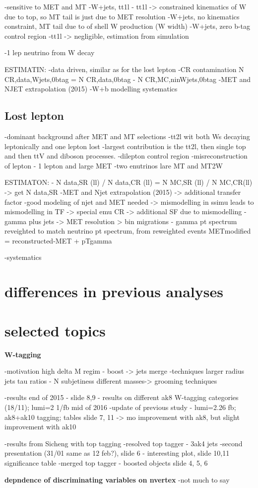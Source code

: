 -sensitive to MET and MT
-W+jets, tt1l
- tt1l -> constrained kinematics of W due to top, so MT tail is just due to MET resolution
-W+jets, no kinematics constraint, MT tail due to of shell W production (W width) 
-W+jets, zero b-tag control region
-tt1l -> negligible, estimation from simulation

-1 lep neutrino from W decay

ESTIMATIN:
-data driven, similar as for the lost lepton
-CR contamination N CR,data,Wjets,0btag = N CR,data,0btag - N CR,MC,ninWjets,0btag
-MET and NJET extrapolation (2015)
-W+b modelling systematics

\subsection{Lost lepton}
-dominant background after MET and MT selections
-tt2l wit both Ws decaying leptonically and one lepton lost
-largest contribution is the tt2l, then single top and then ttV and diboson processes.
-dilepton control region
-misreconstruction of lepton - 1 lepton and large MET
-two enutrinos lare MT and MT2W

ESTIMATON:
- N data,SR (ll) / N data,CR (ll) = N MC,SR (ll) / N MC,CR(ll) -> get N data,SR
-MET and Njet extrapolation (2015) -> additional transfer factor
-good modeling of njet and MET needed -> mismodelling in ssimu leads to mismodelling in TF -> special emu CR -> additional SF due to mismodelling
-gamma plus jets -> MET resolution > bin migrations - gamma pt spectrum reveighted to match neutrino pt spectrum, from reweighted events METmodified = reconstructed-MET + pTgamma


-systematics


\section{differences in previous analyses}

\section{selected topics}

\textbf{W-tagging}

-motivation
	high delta M regim - boost -> jets merge
-techniques
	larger radius jets
	tau ratios - N subjetiness
	different masses-> grooming techniques
	
-results
	end of 2015 - slide 8,9 - results on different ak8 W-tagging categories (18/11); lumi=2 1/fb
	mid of 2016 -update of previous study - lumi=2.26 fb; ak8+ak10 tagging; tables slide 7, 11 -> mo improvement with ak8, but slight improvement with ak10 

-results from Sicheng with top tagging
	-resolved top tagger - 3ak4 jets
	-second presentation (31/01 same as 12 feb?), slide 6 - interesting plot, slide 10,11 significance table
        -merged top tagger - boosted objects
		slide 4, 5, 6

\textbf{depndence of discriminating variables on nvertex}
-not much to say
	
